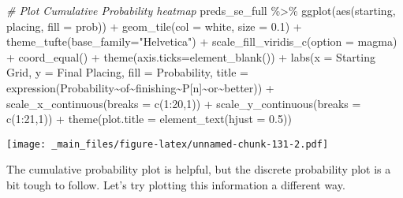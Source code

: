 \documentclass[
]{book}
\newenvironment{Shaded}{\begin{snugshade}}{\end{snugshade}}
\newcommand{\AttributeTok}[1]{\textcolor[rgb]{0.77,0.63,0.00}{#1}}
\newcommand{\CommentTok}[1]{\textcolor[rgb]{0.56,0.35,0.01}{\textit{#1}}}
\newcommand{\DecValTok}[1]{\textcolor[rgb]{0.00,0.00,0.81}{#1}}
\newcommand{\FloatTok}[1]{\textcolor[rgb]{0.00,0.00,0.81}{#1}}
\newcommand{\FunctionTok}[1]{\textcolor[rgb]{0.00,0.00,0.00}{#1}}
\newcommand{\NormalTok}[1]{#1}
\newcommand{\SpecialCharTok}[1]{\textcolor[rgb]{0.00,0.00,0.00}{#1}}
\newcommand{\StringTok}[1]{\textcolor[rgb]{0.31,0.60,0.02}{#1}}
\begin{document}
\begin{Shaded}
\begin{Highlighting}[]
\CommentTok{\# Plot Cumulative Probability heatmap }
\NormalTok{preds\_se\_full }\SpecialCharTok{\%\textgreater{}\%}
  \FunctionTok{ggplot}\NormalTok{(}\FunctionTok{aes}\NormalTok{(starting, placing, }\AttributeTok{fill =}\NormalTok{ prob)) }\SpecialCharTok{+}
  \FunctionTok{geom\_tile}\NormalTok{(}\AttributeTok{col =} \StringTok{\textquotesingle{}white\textquotesingle{}}\NormalTok{, }\AttributeTok{size =} \FloatTok{0.1}\NormalTok{) }\SpecialCharTok{+}
  \FunctionTok{theme\_tufte}\NormalTok{(}\AttributeTok{base\_family=}\StringTok{"Helvetica"}\NormalTok{) }\SpecialCharTok{+}
  \FunctionTok{scale\_fill\_viridis\_c}\NormalTok{(}\AttributeTok{option =} \StringTok{\textquotesingle{}magma\textquotesingle{}}\NormalTok{) }\SpecialCharTok{+}
  \FunctionTok{coord\_equal}\NormalTok{() }\SpecialCharTok{+}
  \FunctionTok{theme}\NormalTok{(}\AttributeTok{axis.ticks=}\FunctionTok{element\_blank}\NormalTok{()) }\SpecialCharTok{+}
  \FunctionTok{labs}\NormalTok{(}\AttributeTok{x =} \StringTok{\textquotesingle{}Starting Grid\textquotesingle{}}\NormalTok{,}
       \AttributeTok{y =} \StringTok{\textquotesingle{}Final Placing\textquotesingle{}}\NormalTok{,}
       \AttributeTok{fill =} \StringTok{\textquotesingle{}Probability\textquotesingle{}}\NormalTok{,}
       \AttributeTok{title =} \FunctionTok{expression}\NormalTok{(Probability}\SpecialCharTok{\textasciitilde{}}\NormalTok{of}\SpecialCharTok{\textasciitilde{}}\NormalTok{finishing}\SpecialCharTok{\textasciitilde{}}\NormalTok{P[n]}\SpecialCharTok{\textasciitilde{}}\NormalTok{or}\SpecialCharTok{\textasciitilde{}}\NormalTok{better)) }\SpecialCharTok{+}
  \FunctionTok{scale\_x\_continuous}\NormalTok{(}\AttributeTok{breaks =} \FunctionTok{c}\NormalTok{(}\DecValTok{1}\SpecialCharTok{:}\DecValTok{20}\NormalTok{,}\DecValTok{1}\NormalTok{)) }\SpecialCharTok{+}
  \FunctionTok{scale\_y\_continuous}\NormalTok{(}\AttributeTok{breaks =} \FunctionTok{c}\NormalTok{(}\DecValTok{1}\SpecialCharTok{:}\DecValTok{21}\NormalTok{,}\DecValTok{1}\NormalTok{)) }\SpecialCharTok{+}
  \FunctionTok{theme}\NormalTok{(}\AttributeTok{plot.title =} \FunctionTok{element\_text}\NormalTok{(}\AttributeTok{hjust =} \FloatTok{0.5}\NormalTok{))}
\end{Highlighting}
\end{Shaded}

\texttt{[image: \_main\_files/figure-latex/unnamed-chunk-131-2.pdf]}

The cumulative probability plot is helpful, but the discrete probability plot is a bit tough to follow. Let's try plotting this information a different way.
\end{document}
